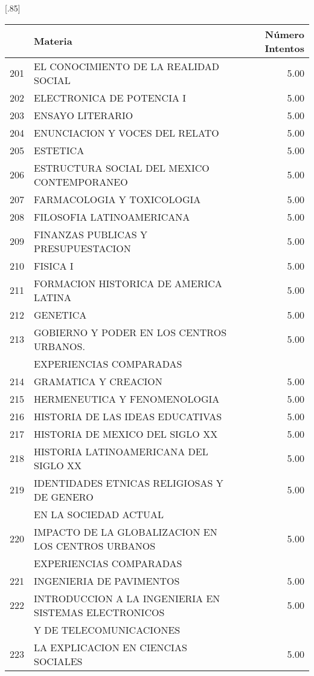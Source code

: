\documentclass[12pt]{article}
\begin{document}
\begin{table}[ht]
\centering
\scalebox{0.75}[.85]{
\begin{tabular}{rlr}
  \hline
 & Materia & N\'umero Intentos \\ 
  \hline
    201 & EL CONOCIMIENTO DE LA REALIDAD SOCIAL & 5.00 \\ 
  202 & ELECTRONICA DE POTENCIA I & 5.00 \\ 
  203 & ENSAYO LITERARIO & 5.00 \\ 
  204 & ENUNCIACION Y VOCES DEL RELATO & 5.00 \\ 
  205 & ESTETICA & 5.00 \\ 
  206 & ESTRUCTURA SOCIAL DEL MEXICO CONTEMPORANEO & 5.00 \\ 
  207 & FARMACOLOGIA Y TOXICOLOGIA & 5.00 \\ 
  208 & FILOSOFIA LATINOAMERICANA & 5.00 \\ 
  209 & FINANZAS PUBLICAS Y PRESUPUESTACION & 5.00 \\ 
  210 & FISICA I & 5.00 \\ 
  211 & FORMACION HISTORICA DE AMERICA LATINA & 5.00 \\ 
  212 & GENETICA & 5.00 \\ 
  213 & GOBIERNO Y PODER EN LOS CENTROS URBANOS.& 5.00 \\ 
 & EXPERIENCIAS COMPARADAS &  \\ 
  214 & GRAMATICA Y CREACION & 5.00 \\ 
  215 & HERMENEUTICA Y FENOMENOLOGIA & 5.00 \\ 
  216 & HISTORIA DE LAS IDEAS EDUCATIVAS & 5.00 \\ 
  217 & HISTORIA DE MEXICO DEL SIGLO XX & 5.00 \\ 
  218 & HISTORIA LATINOAMERICANA DEL SIGLO XX & 5.00 \\ 
  219 & IDENTIDADES ETNICAS RELIGIOSAS Y DE GENERO & 5.00 \\ 
   & EN LA SOCIEDAD ACTUAL &  \\ 
  220 & IMPACTO DE LA GLOBALIZACION EN LOS CENTROS URBANOS & 5.00 \\ 
 &  EXPERIENCIAS COMPARADAS &  \\ 
  221 & INGENIERIA DE PAVIMENTOS & 5.00 \\ 
  222 & INTRODUCCION A LA INGENIERIA EN SISTEMAS ELECTRONICOS & 5.00 \\ 
& Y DE TELECOMUNICACIONES & \\ 
  223 & LA EXPLICACION EN CIENCIAS SOCIALES & 5.00 \\ 

\end{tabular}}
\end{table}
\end{document}
